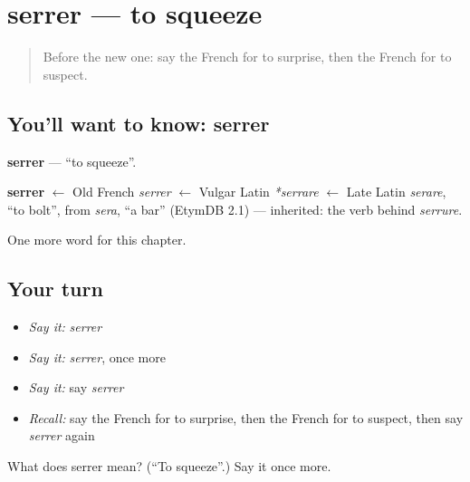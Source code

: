 \section[serrer]{serrer — to squeeze}

\label{lesson:FR-C213-serrer}



\begin{quote}
Before the new one: say the French for to surprise, then the French for to suspect.
\end{quote}

\subsection*{You'll want to know: serrer}
\textbf{serrer} — \textquotedblleft{}to squeeze\textquotedblright{}.

\begin{cousinweb}
\textbf{serrer} $\leftarrow$ Old French \emph{serrer} $\leftarrow$ Vulgar Latin \emph{*serrare} $\leftarrow$ Late Latin \emph{serare}, \textquotedblleft{}to bolt\textquotedblright{}, from \emph{sera}, \textquotedblleft{}a bar\textquotedblright{} (EtymDB 2.1) — inherited: the verb behind \emph{serrure}.
\end{cousinweb}

\begin{grammarlens}[title={What you've built}]
One more word for this chapter.
\end{grammarlens}

\subsection*{Your turn}
\begin{itemize}
\raggedright
  \item \emph{Say it:} \emph{serrer}
  \item \emph{Say it:} \emph{serrer}, once more
  \item \emph{Say it:} say \emph{serrer}
  \item \emph{Recall:} say the French for to surprise, then the French for to suspect, then say \emph{serrer} again
\end{itemize}

\begin{tcolorbox}[breakable,colback=teal!4,colframe=teal!35!black,title={Before you move on}]
What does serrer mean? (\textquotedblleft{}To squeeze\textquotedblright{}.) Say it once more.
\end{tcolorbox}
